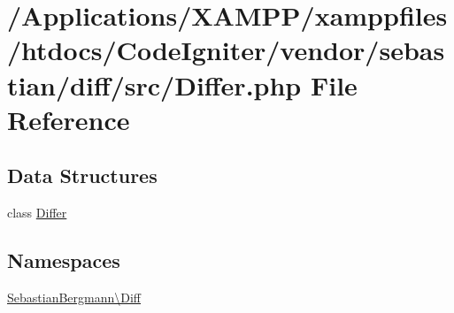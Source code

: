\hypertarget{_differ_8php}{}\section{/\+Applications/\+X\+A\+M\+P\+P/xamppfiles/htdocs/\+Code\+Igniter/vendor/sebastian/diff/src/\+Differ.php File Reference}
\label{_differ_8php}
\subsection*{Data Structures}
\begin{DoxyCompactItemize}
\item 
class \mbox{\hyperlink{class_sebastian_bergmann_1_1_diff_1_1_differ}{Differ}}
\end{DoxyCompactItemize}
\subsection*{Namespaces}
\begin{DoxyCompactItemize}
\item 
 \mbox{\hyperlink{namespace_sebastian_bergmann_1_1_diff}{Sebastian\+Bergmann\textbackslash{}\+Diff}}
\end{DoxyCompactItemize}
